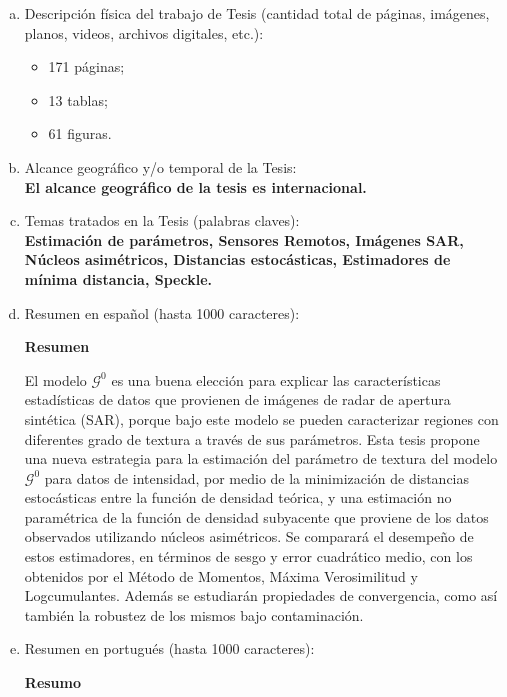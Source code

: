 \begin{enumerate}[a)]
	\item Descripción física del trabajo de Tesis (cantidad total de páginas, imágenes, planos, videos, archivos digitales, etc.):
	\begin{itemize}%
		\item 171 páginas;
		\item 13 tablas;
		\item 61 figuras.
	\end{itemize}
	
	\item Alcance geográfico y/o temporal de la Tesis: \\
	\textbf{El alcance geográfico de la tesis es internacional.}
	
	\item Temas tratados en la Tesis (palabras claves): \\
	\textbf{Estimación de parámetros, Sensores Remotos, Imágenes SAR, Núcleos asimétricos, Distancias estocásticas, Estimadores de mínima distancia, Speckle.}
	
	\item Resumen en español (hasta 1000 caracteres): 
	
	\textbf{Resumen}
	
	El modelo $\mathcal{G}^0$ es una buena elección para explicar las características estadísticas de datos que provienen de imágenes de radar de apertura sintética (SAR), porque bajo este modelo se pueden caracterizar regiones con diferentes grado de textura a través de sus parámetros.  Esta tesis propone una nueva estrategia para la estimación del parámetro de textura del modelo $\mathcal G^0$ para datos de intensidad, por medio de la minimización de distancias estocásticas entre la función de densidad teórica, y una estimación no paramétrica de la función de densidad subyacente que proviene de los datos observados utilizando núcleos asimétricos. Se comparará el desempeño de estos estimadores, en términos de sesgo y error cuadrático medio, con los obtenidos por el Método de Momentos, Máxima Verosimilitud y Logcumulantes. Además se estudiarán propiedades de convergencia, como así también la robustez de los mismos bajo contaminación. 
	
	
	\item Resumen en portugués (hasta 1000 caracteres):
	
	\textbf{Resumo}
	

\end{enumerate}
